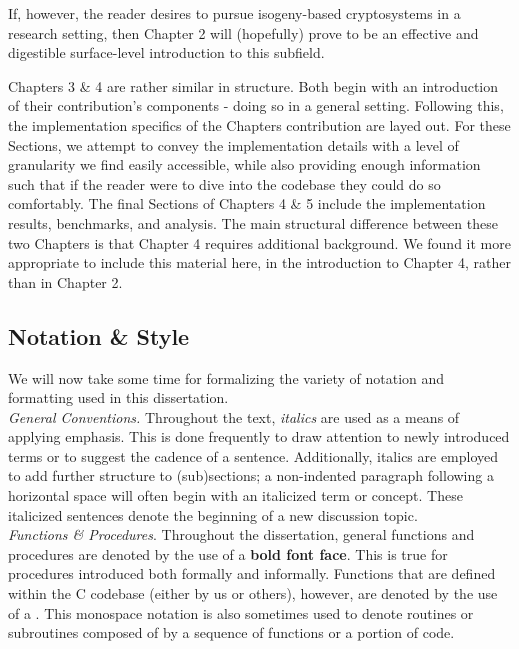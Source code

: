 If, however, the reader desires to pursue isogeny-based cryptosystems in a research setting, then Chapter 2 will (hopefully) prove to be an effective and digestible surface-level introduction to this subfield.  

Chapters 3 \& 4 are rather similar in structure. Both begin with an introduction of their contribution's components - doing so in a general setting. Following this, the implementation specifics of the Chapters contribution are layed out. For these Sections, we attempt to convey the implementation details with a level of granularity we find easily accessible, while also providing enough information such that if the reader were to dive into the codebase they could do so comfortably. The final Sections of Chapters 4 \& 5 include the implementation results, benchmarks, and analysis. The main structural difference between these two Chapters is that Chapter 4 requires additional background. We found it more appropriate to include this material here, in the introduction to Chapter 4, rather than in Chapter 2.

\subsection{Notation \& Style}

We will now take some time for formalizing the variety of notation and formatting  used in this dissertation.\\

\noindent
\textit{General Conventions.} Throughout the text, \textit{italics} are used as a means of applying emphasis. This is done frequently to draw attention to newly introduced terms or to suggest the cadence of a sentence. Additionally, italics are employed to add further structure to (sub)sections; a non-indented paragraph following a horizontal space will often begin with an italicized term or concept. These italicized sentences denote the beginning of a new discussion topic.\\

\noindent
\textit{Functions \& Procedures}. Throughout the dissertation, general functions and procedures are denoted by the use of a \textbf{bold font face}. This is true for procedures introduced both formally and informally. Functions that are defined within the \sidh C codebase (either by us or others), however, are denoted by the use of a . This monospace notation is also sometimes used to denote routines or subroutines composed of by a sequence of functions or a portion of code. 

